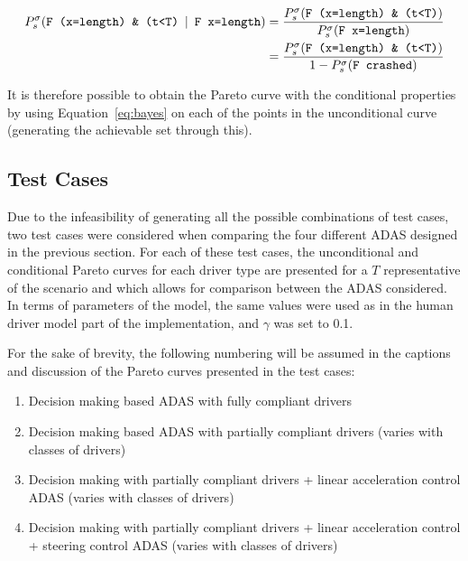 \begin{equation}
\label{eq:bayes}
\begin{aligned}
	P^{\sigma}_s (\text{\texttt{F (x=length) \& (t<T)}} \:\mid\: \text{\texttt{F x=length}}) & = \frac{P^{\sigma}_s (\text{\texttt{F (x=length) \& (t<T)}})}{P^{\sigma}_s (\text{\texttt{F x=length}})} \\
	&  = \frac{P^{\sigma}_s (\text{\texttt{F (x=length) \& (t<T)}})}{1 - P^{\sigma}_s (\text{\texttt{F crashed}})}
\end{aligned}
\end{equation}

It is therefore possible to obtain the Pareto curve with the conditional properties by using Equation~\ref{eq:bayes} on each of the points in the unconditional curve (generating the achievable set through this).

\subsection{Test Cases}

Due to the infeasibility of generating all the possible combinations of test cases, two test cases were considered when comparing the four different ADAS designed in the previous section. For each of these test cases, the unconditional and conditional Pareto curves for each driver type are presented for a $T$ representative of the scenario and which allows for comparison between the ADAS considered. In terms of parameters of the model, the same values were used as in the human driver model part of the implementation, and $\gamma$ was set to 0.1.

For the sake of brevity, the following numbering will be assumed in the captions and discussion of the Pareto curves presented in the test cases:

\begin{enumerate}
	\item Decision making based ADAS with fully compliant drivers
	\item Decision making based ADAS with partially compliant drivers (varies with classes of drivers)
	\item Decision making with partially compliant drivers + linear acceleration control ADAS (varies with classes of drivers)
	\item Decision making with partially compliant drivers + linear acceleration control + steering control ADAS (varies with classes of drivers)
\end{enumerate}

